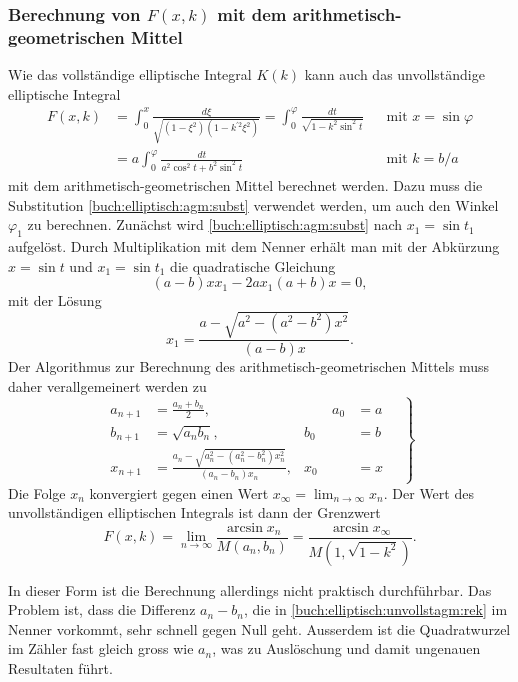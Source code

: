 %
%
\subsubsection{Berechnung von $F(x,k)$ mit dem arithmetisch-geometrischen
Mittel\label{buch:elliptisch:subsubection:berechnung-fxk-agm}}
Wie das vollständige elliptische Integral $K(k)$ kann auch das  
unvollständige elliptische Integral
\begin{align*}
F(x,k)
&=
\int_0^x \frac{d\xi}{\sqrt{(1-\xi^2)(1-k^{\prime 2}\xi^2)}}
=
\int_0^{\varphi}
\frac{dt}{\sqrt{1-k^2 \sin^2 t}}
&&\text{mit $x=\sin\varphi$}
\\
&=
a
\int_0^{\varphi} \frac{dt}{a^2 \cos^2 t + b^2 \sin^2 t}
&&\text{mit $k=b/a$}
\end{align*}
mit dem arithmetisch-geometrischen Mittel berechnet werden.
Dazu muss die Substitution
\eqref{buch:elliptisch:agm:subst}
verwendet werden, um auch den Winkel $\varphi_1$ zu berechnen.
Zunächst wird \eqref{buch:elliptisch:agm:subst} nach $x_1=\sin t_1$ 
aufgelöst.
Durch Multiplikation mit dem Nenner erhält man mit der Abkürzung
$x=\sin t$ und $x_1=\sin t_1$  die quadratische Gleichung
\[
(a-b)x x_1
-
2ax_1
(a+b)x 
=
0,
\]
mit der Lösung
\begin{equation}
x_1 
=
\frac{a-\sqrt{a^2-(a^2-b^2)x^2}}{(a-b)x}.
\label{buch:elliptisch:unvollstagm:xrek}
\end{equation}
Der Algorithmus zur Berechnung des arithmetisch-geometrischen Mittels
muss daher verallgemeinert werden zu
\begin{equation}
\left.
\begin{aligned}
a_{n+1} &= \frac{a_n+b_n}2,  &\qquad a_0 &= a
\\
b_{n+1} &= \sqrt{a_nb_n},    & b_0 &= b
\\
x_{n+1} &= \frac{a_n-\sqrt{a_n^2-(a_n^2-b_n^2)x_n^2}}{(a_n-b_n)x_n}, & x_0 &= x
\end{aligned}
\quad
\right\}
\label{buch:elliptisch:unvollstagm:rek}
\end{equation}
Die Folge $x_n$ konvergiert gegen einen Wert $x_{\infty} = \lim_{n\to\infty} x_n$.
Der Wert des unvollständigen elliptischen Integrals ist dann der Grenzwert
\[
F(x,k)
=
\lim_{n\to\infty}
\frac{\arcsin x_n}{M(a_n,b_n)}
=
\frac{\arcsin x_{\infty}}{M(1,\sqrt{1-k^2})}.
\]

In dieser Form ist die Berechnung allerdings nicht praktisch durchführbar.
Das Problem ist, dass die Differenz $a_n-b_n$, die in 
\eqref{buch:elliptisch:unvollstagm:rek}
im Nenner vorkommt, sehr schnell gegen Null geht.
Ausserdem ist die Quadratwurzel im Zähler fast gleich gross wie
$a_n$, was zu Auslöschung und damit ungenauen Resultaten führt.
\label{buch:elliptisch:agm:ellintegral-stabilitaet}

